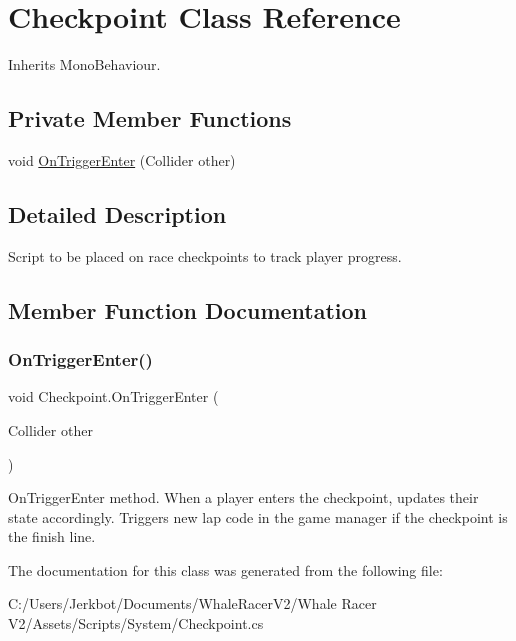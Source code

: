 \hypertarget{class_checkpoint}{}\section{Checkpoint Class Reference}
\label{class_checkpoint}


Inherits Mono\+Behaviour.

\subsection*{Private Member Functions}
\begin{DoxyCompactItemize}
\item 
void \hyperlink{class_checkpoint_a4640829baa9a8f554e8cb17e7fcf9df9}{On\+Trigger\+Enter} (Collider other)
\end{DoxyCompactItemize}


\subsection{Detailed Description}
Script to be placed on race checkpoints to track player progress. 



\subsection{Member Function Documentation}
\mbox{\label{class_checkpoint_a4640829baa9a8f554e8cb17e7fcf9df9}} 
\subsubsection{\texorpdfstring{On\+Trigger\+Enter()}{OnTriggerEnter()}}
{\footnotesize\ttfamily void Checkpoint.\+On\+Trigger\+Enter (\begin{DoxyParamCaption}\item[{Collider}]{other }\end{DoxyParamCaption})\hspace{0.3cm}{\ttfamily [private]}}



On\+Trigger\+Enter method. When a player enters the checkpoint, updates their state accordingly. Triggers new lap code in the game manager if the checkpoint is the finish line. 



The documentation for this class was generated from the following file\+:\begin{DoxyCompactItemize}
\item 
C\+:/\+Users/\+Jerkbot/\+Documents/\+Whale\+Racer\+V2/\+Whale Racer V2/\+Assets/\+Scripts/\+System/Checkpoint.\+cs\end{DoxyCompactItemize}
